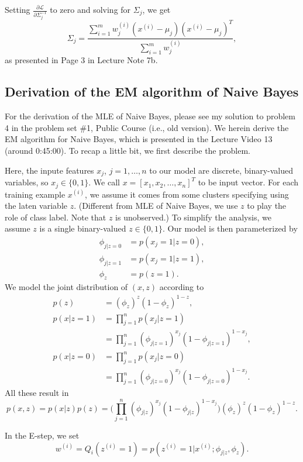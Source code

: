 \documentclass{article}
\begin{document}
Setting $\frac{\partial{\mathcal{L}}}{\partial{\Sigma_j^{-1}}}$ to zero and solving for $\Sigma_j$, we get
\[
\Sigma_j=\frac{\sum_{i=1}^m  w_j^{(i)} (x^{(i)}-\mu_j)(x^{(i)}-\mu_j)^T}{\sum_{i=1}^m  w_j^{(i)}},
\]
as presented in Page 3 in Lecture Note 7b.


\subsection{Derivation of the EM algorithm of Naive Bayes}
For the derivation of the MLE of Naive Bayes, please see my solution to problem 4 in the problem set \#1, Public Course (i.e., old version). We herein derive the EM algorithm for Naive Bayes, which is presented in the Lecture Video 13 (around 0:45:00). To recap a little bit, we first describe the problem.

Here, the inpute features $x_j$, $j=1,\ldots,n$ to our model are discrete, binary-valued variables, so $x_j\in\{0,1\}$. We call $x=[x_1,x_2,\ldots,x_n]^T$ to be input vector. For each training example $x^{(i)}$, we assume it comes from some clusters specifying using the laten variable $z$. (Different from MLE of Naive Bayes, we use $z$ to play the role of class label. Note that $z$ is unobserved.) To simplify the analysis, we assume $z$ is a single binary-valued $z\in\{0,1\}$. Our model is then parameterized by
\[
\begin{split}
\phi_{j|z=0}&=p(x_j=1|z=0),\\
\phi_{j|z=1}&=p(x_j=1|z=1),\\
\phi_z&=p(z=1).
\end{split}
\]
We model the joint distribution of $(x,z)$ according to
\[
\begin{split}
p(z)&=(\phi_z)^z(1-\phi_z)^{1-z},\\
%
p(x|z=1)
&=\prod_{j=1}^{n}p(x_j|z=1)\\
&=\prod_{j=1}^{n}(\phi_{j|z=1})^{x_j}(1-\phi_{j|z=1})^{1-x_j},\\
%
p(x|z=0)
&=\prod_{j=1}^{n}p(x_j|z=0)\\
&=\prod_{j=1}^{n}(\phi_{j|z=0})^{x_j}(1-\phi_{j|z=0})^{1-x_j}.
\end{split}
\]
All these result in
\[
p(x,z)=p(x|z)p(z)=\Bigg(\prod_{j=1}^{n}(\phi_{j|z})^{x_j}(1-\phi_{j|z})^{1-x_j}\Bigg)(\phi_z)^z(1-\phi_z)^{1-z}.
\]

In the E-step, we set
\[
w^{(i)}=Q_i(z^{(i)}=1)=p(z^{(i)}=1|x^{(i)};\phi_{j|z},\phi_z).
\]
\end{document}

